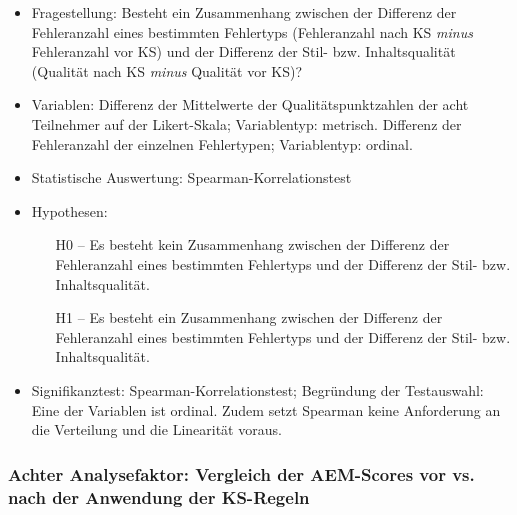 \begin{itemize}
\item Fragestellung: Besteht ein Zusammenhang zwischen der Differenz der Fehleranzahl eines bestimmten Fehlertyps (Fehleranzahl nach KS \textit{minus} Fehleranzahl vor KS) und der Differenz der Stil- bzw. Inhaltsqualität (Qualität nach KS \textit{minus} Qualität vor KS)?
\item Variablen: Differenz der Mittelwerte der Qualitätspunktzahlen der acht Teilnehmer auf der Likert-Skala; Variablentyp: metrisch. Differenz der Fehleranzahl der einzelnen Fehlertypen; Variablentyp: ordinal.
\item Statistische Auswertung: Spearman-Korrelationstest
\item Hypothesen:

  \begin{itemize}[align=left]
  \item [H0 --] Es besteht kein Zusammenhang zwischen der Differenz der Fehleranzahl eines bestimmten Fehlertyps und der Differenz der Stil- bzw. Inhaltsqualität.

  \item [H1 --] Es besteht ein Zusammenhang zwischen der Differenz der Fehleranzahl eines bestimmten Fehlertyps und der Differenz der Stil- bzw. Inhaltsqualität.
  \end{itemize}

\item Signifikanztest: Spearman-Korrelationstest; Begründung der Testauswahl: Eine der Variablen ist ordinal. Zudem setzt Spearman keine Anforderung an die Verteilung und die Linearität voraus.
\end{itemize}

\subsubsection{Achter Analysefaktor: Vergleich der AEM-Scores vor vs. nach der Anwendung der KS-Regeln}


